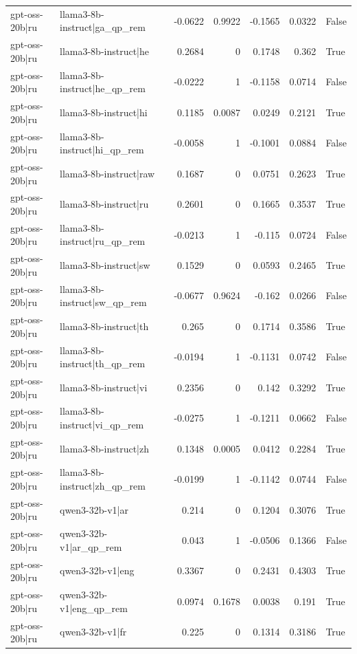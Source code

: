 \begin{table}
\begin{tabular}{l l r r r r l}
gpt-oss-20b|ru & llama3-8b-instruct|ga_qp_rem & -0.0622 & 0.9922 & -0.1565 & 0.0322 & False \\
gpt-oss-20b|ru & llama3-8b-instruct|he & 0.2684 & 0 & 0.1748 & 0.362 & True \\
gpt-oss-20b|ru & llama3-8b-instruct|he_qp_rem & -0.0222 & 1 & -0.1158 & 0.0714 & False \\
gpt-oss-20b|ru & llama3-8b-instruct|hi & 0.1185 & 0.0087 & 0.0249 & 0.2121 & True \\
gpt-oss-20b|ru & llama3-8b-instruct|hi_qp_rem & -0.0058 & 1 & -0.1001 & 0.0884 & False \\
gpt-oss-20b|ru & llama3-8b-instruct|raw & 0.1687 & 0 & 0.0751 & 0.2623 & True \\
gpt-oss-20b|ru & llama3-8b-instruct|ru & 0.2601 & 0 & 0.1665 & 0.3537 & True \\
gpt-oss-20b|ru & llama3-8b-instruct|ru_qp_rem & -0.0213 & 1 & -0.115 & 0.0724 & False \\
gpt-oss-20b|ru & llama3-8b-instruct|sw & 0.1529 & 0 & 0.0593 & 0.2465 & True \\
gpt-oss-20b|ru & llama3-8b-instruct|sw_qp_rem & -0.0677 & 0.9624 & -0.162 & 0.0266 & False \\
gpt-oss-20b|ru & llama3-8b-instruct|th & 0.265 & 0 & 0.1714 & 0.3586 & True \\
gpt-oss-20b|ru & llama3-8b-instruct|th_qp_rem & -0.0194 & 1 & -0.1131 & 0.0742 & False \\
gpt-oss-20b|ru & llama3-8b-instruct|vi & 0.2356 & 0 & 0.142 & 0.3292 & True \\
gpt-oss-20b|ru & llama3-8b-instruct|vi_qp_rem & -0.0275 & 1 & -0.1211 & 0.0662 & False \\
gpt-oss-20b|ru & llama3-8b-instruct|zh & 0.1348 & 0.0005 & 0.0412 & 0.2284 & True \\
gpt-oss-20b|ru & llama3-8b-instruct|zh_qp_rem & -0.0199 & 1 & -0.1142 & 0.0744 & False \\
gpt-oss-20b|ru & qwen3-32b-v1|ar & 0.214 & 0 & 0.1204 & 0.3076 & True \\
gpt-oss-20b|ru & qwen3-32b-v1|ar_qp_rem & 0.043 & 1 & -0.0506 & 0.1366 & False \\
gpt-oss-20b|ru & qwen3-32b-v1|eng & 0.3367 & 0 & 0.2431 & 0.4303 & True \\
gpt-oss-20b|ru & qwen3-32b-v1|eng_qp_rem & 0.0974 & 0.1678 & 0.0038 & 0.191 & True \\
gpt-oss-20b|ru & qwen3-32b-v1|fr & 0.225 & 0 & 0.1314 & 0.3186 & True \\

\end{tabular}
\end{table}
